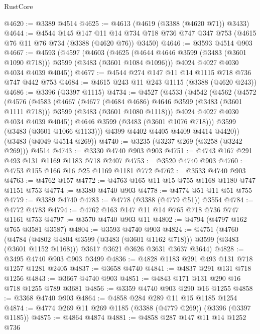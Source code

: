 \begin{lexlean}{RustCore}
\begin{coremodule}
@4620 := @3389 @4514
@4625 := @4613 (@4619 (@3388 (@4620 @71)) @3433)
@4644 := @4544
    @145
    @147
    @11
    @14
    @734
    @718
    @736
    @747
    @347
    @753
    (@4615 @76 @11 @76 @734 (@3388 (@4620 @76)) @3450)
@4646 := @3593 @4514 @903
@4667 := @4593
    (@4597
      (@4603
        (@4625 (@4644 @4646 @3599 (@3483 (@3601 @1090 @718))) @3599 (@3483 (@3601 @1084 @1096)))
        @4024
        @4027
        @4030
        @4034
        @4039
        @4045))
@4677 := @4544 @274 @147 @11 @14 @1115 @718 @736 @747 @442 @753
@4684 := @4615 @243 @11 @243 @1115 (@3388 (@4620 @243))
@4686 := @3396 (@3397 @1115)
@4734 := @4527
    (@4533
      (@4542
        (@4562
          (@4572
            (@4576
              (@4583
                (@4667
                  (@4677 (@4684 @4686) @4646 @3599 (@3483 (@3601 @1111 @718)))
                  @3599
                  (@3483 (@3601 @1080 @1118)))
                @4024
                @4027
                @4030
                @4034
                @4039
                @4045))
            @4646
            @3599
            (@3483 (@3601 @1076 @718)))
          @3599
          (@3483 (@3601 @1066 @1133)))
        @4399
        @4402
        @4405
        @4409
        @4414
        @4420))
    (@3483 (@4049 @4514 @269))
@4740 := @3235 (@3237 @269 (@3258 (@3242 @269))) @4514
@4743 := @3330 @4740 @903 @903
@4751 := @4743 @167 @291 @493 @131 @1169 @1183 @718 @2407
@4753 := @3520 @4740 @903
@4760 := @4753 @155 @166 @16 @25 @1169 @1181 @772
@4762 := @3533 @4740 @903
@4763 := @4762 @157
@4772 := @4763 @165 @11 @15 @755 @1168 @1180 @747 @1151 @753
@4774 := @3380 @4740 @903
@4778 := @4774 @51 @11 @51 @755
@4779 := @3389 @4740
@4783 := @4778 (@3388 (@4779 @51)) @3554
@4784 := @4772 @4783
@4794 := @4762 @163 @147 @11 @14 @765 @718 @736 @747 @1161 @753
@4797 := @3570 @4740 @903 @11
@4802 := @4794 (@4797 @162 @765 @3581 @3587)
@4804 := @3593 @4740 @903
@4824 := @4751
    (@4760
      (@4784 (@4802 @4804 @3599 (@3483 (@3601 @1162 @718))) @3599 (@3483 (@3601 @1152 @1168)))
      @3617
      @3621
      @3626
      @3631
      @3637
      @3644)
@4828 := @3495 @4740 @903 @903 @3499
@4836 := @4828 @1183 @291 @493 @131 @718 @1257 @1281 @2405
@4837 := @3658 @4740
@4841 := @4837 @291 @131 @718 @1256
@4843 := @3667 @4740 @903
@4851 := @4843 @171 @131 @290 @16 @718 @1255 @789 @3681
@4856 := @3359 @4740 @903 @290 @16 @1255
@4858 := @3368 @4740 @903
@4864 := @4858 @284 @289 @11 @15 @1185 @1254
@4874 := @4774 @269 @11 @269 @1185 (@3388 (@4779 @269)) (@3396 (@3397 @1185))
@4875 := @4864 @4874
@4881 := @4858 @287 @147 @11 @14 @1252 @736

\end{coremodule}
\end{lexlean}
